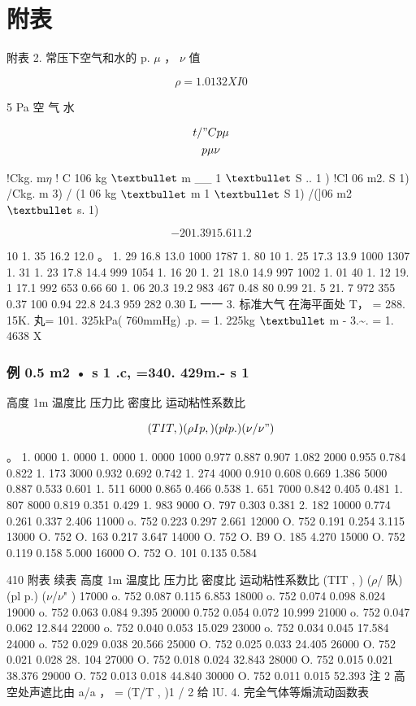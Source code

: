 \chapter{附表}
附表 2. 常压下空气和水的 p. $\mu$ ， $\nu$ 值

\[\rho = 1. 0132XI0\]

5 Pa 空 气 水

\begin{gather*}
t/"C p \mu \\
p \mu  \nu 
\end{gather*}

!Ckg. m$\eta$ ! C 106 kg ${\rm •}$ m \_\_ 1 ${\rm •}$ S .. 1 ) !Cl 06 m2. S 1) /Ckg. m 3) / (1 06 kg ${\rm •}$ m 1 ${\rm •}$ S 1) /(]06 m2 ${\rm •}$ s. 1)

\[- 20 1. 39 15.6 11. 2\]

10 1. 35 16.2 12.0 。 1. 29 16.8 13.0 1000 1787 1. 80 10 1. 25 17.3 13.9 1000 1307 1. 31 1. 23 17.8 14.4 999 1054 1. 16 20 1. 21 18.0 14.9 997 1002 1. 01 40 1. 12 19. 1 17.1 992 653 0.66 60 1. 06 20.3 19.2 983 467 0.48 80 0.99 21. 5 21. 7 972 355 0.37 100 0.94 22.8 24.3 959 282 0.30 L 一一 3. 标准大气 在海平面处 T， = 288. 15K. 丸= 101. 325kPa( 760mmHg) .p. = 1. 225kg ${\rm •}$ m - 3.\textasciitilde{}. = 1. 4638 X

\subsection*{例 0.5  m2 • s 1 .c, =340. 429m.- s 1}

高度 1m 温度比 压力比 密度比 运动粘性系数比

\[(TIT , ) (\rho  Ip ,  ) (pl p.) (\nu /\nu " )\]

。 1. 0000 1. 0000 1. 0000 1. 0000 1000 0.977 0.887 0.907 1.082 2000 0.955 0.784 0.822 1. 173 3000 0.932 0.692 0.742 1. 274 4000 0.910 0.608 0.669 1.386 5000 0.887 0.533 0.601 1. 511 6000 0.865 0.466 0.538 1. 651 7000 0.842 0.405 0.481 1. 807 8000 0.819 0.351 0.429 1. 983 9000 O. 797 0.303 0.381 2. 182 10000 0.774 0.261 0.337 2.406 11000 o. 752 0.223 0.297 2.661 12000 O. 752 0.191 0.254 3.115 13000 O. 752 O. 163 0.217 3.647 14000 O. 752 O. B9 O. 185 4.270 15000 O. 752 0.119 0.158 5.000 16000 O. 752 O. 101 0.135 0.584

410 附表 续表 高度 1m 温度比 压力比 密度比 运动粘性系数比 (TIT , ) ($\rho$/ 队) (pl p.) ($\nu$/$\nu$" ) 17000 o. 752 0.087 0.115 6.853 18000 o. 752 0.074 0.098 8.024 19000 o. 752 0.063 0.084 9.395 20000 0.752 0.054 0.072 10.999 21000 o. 752 0.047 0.062 12.844 22000 o. 752 0.040 0.053 15.029 23000 o. 752 0.034 0.045 17.584 24000 o. 752 0.029 0.038 20.566 25000 O. 752 0.025 0.033 24.405 26000 O. 752 0.021 0.028 28. 104 27000 O. 752 0.018 0.024 32.843 28000 O. 752 0.015 0.021 38.376 29000 O. 752 0.013 0.018 44.840 30000 O. 752 0.011 0.015 52.393 注 2 高空处声遮比由 a/a ， = (T/T , )1 / 2 给 lU. 4. 完全气体等煽流动函数表

